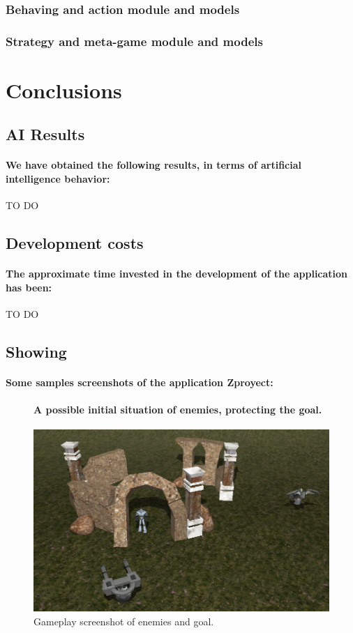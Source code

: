 \documentclass[a4paper,10pt]{article}
\newcommand{\p}[1]{\paragraph{\indent\textnormal{#1}}}
\begin{document}
  \subsubsection{Behaving and action module and models}

  \subsubsection{Strategy and meta-game module and models}


\section{Conclusions}

  \subsection{AI Results}
    \p{We have obtained the following results, in terms of artificial intelligence behavior:}
    TO DO

  \subsection{Development costs}
    \p{The approximate time invested in the development of the application has been:}
    TO DO

  \subsection{Showing}
    \p{Some samples screenshots of the application Zproyect:}

	\begin{figure}[hbt]

	\p{ A possible initial situation of enemies, protecting the goal. \newline}
  
	    \begin{center}
			\includegraphics[scale=.5]{captura1.png}
	    \end{center}
	    \caption{Gameplay screenshot of enemies and goal.}

	\end{figure}
\end{document}
